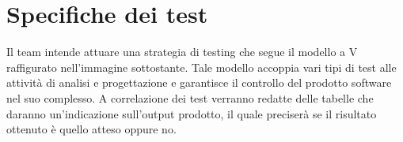 \section{Specifiche dei test}
Il team intende attuare una strategia di testing che segue il modello a V raffigurato nell'immagine sottostante. Tale modello accoppia vari tipi di test alle attività di analisi e progettazione e garantisce il controllo del prodotto software nel suo complesso. A correlazione dei test verranno redatte delle tabelle che daranno un'indicazione sull'output prodotto, il quale preciserà se il risultato ottenuto è quello atteso oppure no.